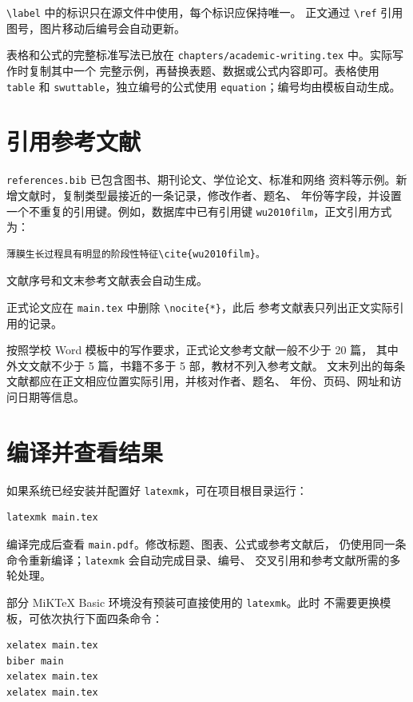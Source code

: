 \verb|\label| 中的标识只在源文件中使用，每个标识应保持唯一。
正文通过 \verb|\ref| 引用图号，图片移动后编号会自动更新。

表格和公式的完整标准写法已放在
\texttt{chapters/academic-writing.tex} 中。实际写作时复制其中一个
完整示例，再替换表题、数据或公式内容即可。表格使用
\texttt{table} 和 \texttt{swuttable}，独立编号的公式使用
\texttt{equation}；编号均由模板自动生成。

\section{引用参考文献}

\texttt{references.bib} 已包含图书、期刊论文、学位论文、标准和网络
资料等示例。新增文献时，复制类型最接近的一条记录，修改作者、题名、
年份等字段，并设置一个不重复的引用键。例如，数据库中已有引用键
\texttt{wu2010film}，正文引用方式为：

\begin{lstlisting}[language={[LaTeX]TeX}]
薄膜生长过程具有明显的阶段性特征\cite{wu2010film}。
\end{lstlisting}

文献序号和文末参考文献表会自动生成。

正式论文应在 \texttt{main.tex} 中删除 \verb|\nocite{*}|，此后
参考文献表只列出正文实际引用的记录。

按照学校 Word 模板中的写作要求，正式论文参考文献一般不少于 20 篇，
其中外文文献不少于 5 篇，书籍不多于 5 部，教材不列入参考文献。
文末列出的每条文献都应在正文相应位置实际引用，并核对作者、题名、
年份、页码、网址和访问日期等信息。

\section{编译并查看结果}

如果系统已经安装并配置好 \texttt{latexmk}，可在项目根目录运行：

\begin{lstlisting}[language=bash]
latexmk main.tex
\end{lstlisting}

编译完成后查看 \texttt{main.pdf}。修改标题、图表、公式或参考文献后，
仍使用同一条命令重新编译；\texttt{latexmk} 会自动完成目录、编号、
交叉引用和参考文献所需的多轮处理。

部分 MiKTeX Basic 环境没有预装可直接使用的 \texttt{latexmk}。此时
不需要更换模板，可依次执行下面四条命令：

\begin{lstlisting}[language=bash]
xelatex main.tex
biber main
xelatex main.tex
xelatex main.tex
\end{lstlisting}

